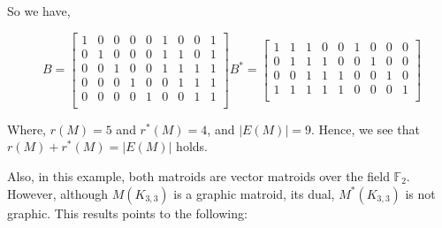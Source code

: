 So we have, 
\begin{figure}[H]
    $$B=\!\!\!\begin{bmatrix}
    1 & 0 & 0 & 0 & 0 & 1 & 0 & 0 & 1\\
    0 & 1 & 0 & 0 & 0 & 1 & 1 & 0 & 1\\
    0 & 0 & 1 & 0 & 0 & 1 & 1 & 1 & 1\\
    0 & 0 & 0 & 1 & 0 & 0 & 1 & 1 & 1\\
    0 & 0 & 0 & 0 & 1 & 0 & 0 & 1 & 1\\
    \end{bmatrix}
  B^*=\!\!\!\begin{bmatrix} 
1 & 1 & 1 & 0 & 0 & 1 & 0 & 0 & 0\\
0 & 1 & 1 & 1 & 0 & 0 & 1 & 0 & 0\\
0 & 0 & 1 & 1 & 1 & 0 & 0 & 1 & 0\\
1 & 1 & 1 & 1 & 1 & 0 & 0 & 0 & 1\\
\end{bmatrix}$$
\end{figure}

Where, $r(M) = 5$ and $r^*(M)=4$, and $|E(M)|=9$.
Hence, we see that $r(M) + r^*(M) = |E(M)|$ holds.

Also, in this example, both matroids are vector matroids over the field $\mathbb{F}_2$. 
However, although $M(K_{3,3})$ is a graphic matroid, its dual, $M^*(K_{3,3})$ is not graphic. This results points to the following:


